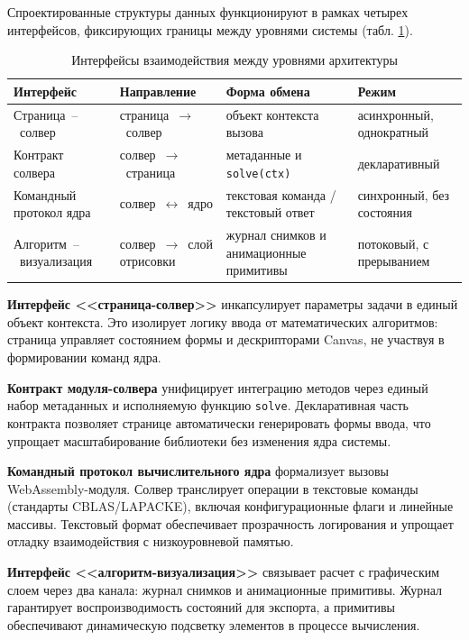 \documentclass[12pt, oneside]{book}
\begin{document}
    \vspace{0.5em}

    \quad Спроектированные структуры данных функционируют в рамках четырех интерфейсов, фиксирующих границы между уровнями системы (табл. \ref{tab:interfaces}).

\begin{table}[htbp]
\centering
\scriptsize
\renewcommand{\arraystretch}{1.15}
\begin{tabular}{|p{3.4cm}|p{2.6cm}|p{3.0cm}|p{3.5cm}|}
\hline
\rowcolor{thbg} \textbf{Интерфейс} & \textbf{Направление} & \textbf{Форма обмена} & \textbf{Режим} \\
\hline
Страница~--~солвер & страница~$\rightarrow$~солвер & объект контекста вызова & асинхронный, однократный \\
\hline
Контракт солвера & солвер~$\rightarrow$~страница & метаданные и \texttt{solve(ctx)} & декларативный \\
\hline
Командный протокол ядра & солвер~$\leftrightarrow$~ядро & текстовая команда / текстовый ответ & синхронный, без состояния \\
\hline
Алгоритм~--~визуализация & солвер~$\rightarrow$~слой отрисовки & журнал снимков и анимационные примитивы & потоковый, с прерыванием \\
\hline
\end{tabular}
\caption{Интерфейсы взаимодействия между уровнями архитектуры}
\label{tab:interfaces}
\end{table}

    \quad \textbf{Интерфейс <<страница-солвер>>} инкапсулирует параметры задачи в единый объект контекста. Это изолирует логику ввода от математических алгоритмов: страница управляет состоянием формы и дескрипторами Canvas, не участвуя в формировании команд ядра.

    \quad \textbf{Контракт модуля-солвера} унифицирует интеграцию методов через единый набор метаданных и исполняемую функцию \texttt{solve}. Декларативная часть контракта позволяет странице автоматически генерировать формы ввода, что упрощает масштабирование библиотеки без изменения ядра системы.

    \quad \textbf{Командный протокол вычислительного ядра} формализует вызовы WebAssembly-модуля. Солвер транслирует операции в текстовые команды (стандарты CBLAS/LAPACKE), включая конфигурационные флаги и линейные массивы. Текстовый формат обеспечивает прозрачность логирования и упрощает отладку взаимодействия с низкоуровневой памятью.

    \quad \textbf{Интерфейс <<алгоритм-визуализация>>} связывает расчет с графическим слоем через два канала: журнал снимков и анимационные примитивы. Журнал гарантирует воспроизводимость состояний для экспорта, а примитивы обеспечивают динамическую подсветку элементов в процессе вычисления.
\end{document}
